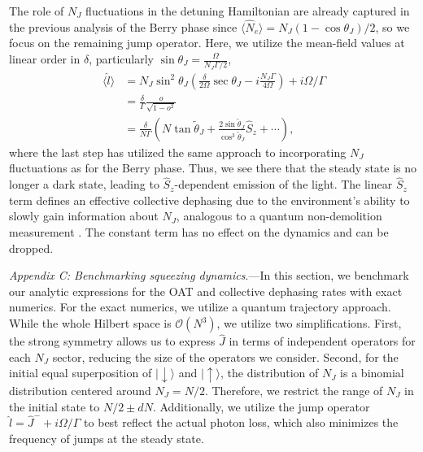 \documentclass[11pt]{article}
\begin{document}
The role of $N_J$ fluctuations in the detuning Hamiltonian are already captured in the previous analysis of the Berry phase since $\langle \hat N_e \rangle = N_J(1- \cos \theta_J)/2$, so we focus on the remaining jump operator. Here, we utilize the mean-field values at linear order in $\delta$, particularly $\sin \theta_J = \frac{\Omega}{N_J \Gamma/2}$,
\begin{equation}
\begin{aligned}
    \langle \hat l \rangle &= N_J \sin^2 \theta_J\left(\frac{\delta}{2 \Omega} \sec \theta_J - i \frac{N_J \Gamma}{4 \Omega} \right) + i \Omega/\Gamma \\
    &= \frac{\delta}{\Gamma} \frac{o}{\sqrt{1-o^2}}\\
    & = \frac{\delta}{N \Gamma} \left(N \tan \tilde{\theta}_J + \frac{2 \sin \tilde{\theta}_J}{ \cos^3 \tilde{\theta}_J } \hat S_z + \cdots\right) ,
    \label{eq:flucdeph}
\end{aligned}
\end{equation}
where the last step has utilized the same approach to incorporating $N_J$ fluctuations as for the Berry phase. Thus, we see there that the steady state is no longer a dark state, leading to $\hat S_z$-dependent emission of the light. The linear $\hat S_z$ term defines an effective collective dephasing due to the environment's ability to slowly gain information about $N_J$, analogous to a quantum non-demolition measurement \cite{Schleier-Smith2010a, Hosten2016, Cox2016, Barberena2023b}. The constant term has no effect on the dynamics and can be dropped.

\emph{Appendix C: Benchmarking squeezing dynamics}.---In this section, we benchmark our analytic expressions for the OAT and collective dephasing rates with exact numerics. For the exact numerics, we utilize a quantum trajectory approach. While the whole Hilbert space is $\mathcal{O}(N^3)$, we utilize two simplifications. First, the strong symmetry allows us to express $\hat J$ in terms of independent operators for each $N_J$ sector, reducing the size of the operators we consider. Second, for the initial equal superposition of $|{\downarrow}\rangle$ and $|{\uparrow}\rangle$, the distribution of $N_J$ is a binomial distribution centered around $N_J = N/2$. Therefore, we restrict the range of $N_J$ in the initial state to $N/2 \pm dN$. Additionally, we utilize the jump operator $\hat l = \hat J^- + i \Omega/\Gamma$ to best reflect the actual photon loss, which also minimizes the frequency of jumps at the steady state.
\end{document}
